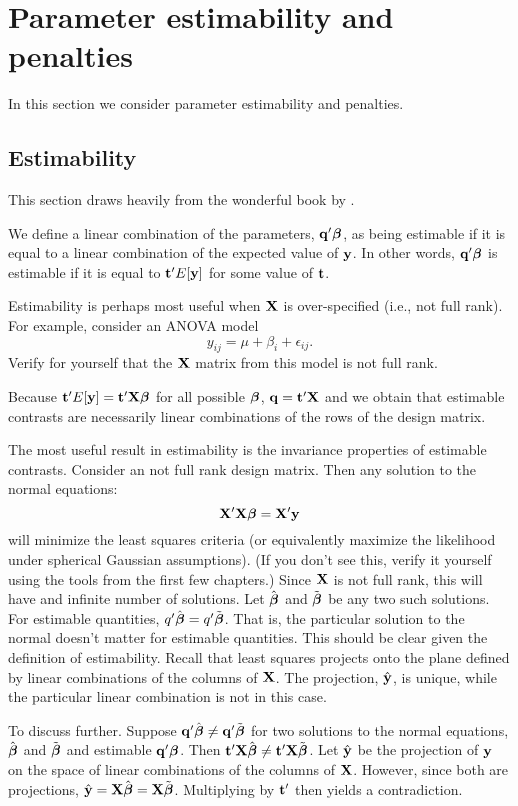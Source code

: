 \section{Parameter estimability and penalties}

In this section we consider parameter estimability and penalties. 

\subsection{Estimability}

This section draws heavily from the wonderful book by \cite{searle2012linear}.

We define a linear combination of the parameters, $\mathbf{q}' \boldsymbol{\beta}$, as being estimable
if it is equal to a linear combination of the expected value of $\mathbf{y}$. In other words,
$\mathbf{q}' \boldsymbol{\beta}$ is estimable if it is equal to $\mathbf{t}' E[\mathbf{y}]$ for some value of $\mathbf{t}$.

Estimability is perhaps most useful when $\mathbf{X}$ is over-specified (i.e., not full rank). For example,
consider an ANOVA model
$$
y_{ij} = \mu + \beta_i + \epsilon_{ij}.
$$
Verify for yourself that the $\mathbf{X}$ matrix from this model is not full rank. 

Because $\mathbf{t}' E[\mathbf{y}] = \mathbf{t}' \mathbf{X} \boldsymbol{\beta}$ for all possible $\boldsymbol{\beta}$, $\mathbf{q} = \mathbf{t}' \mathbf{X}$ and
we obtain that estimable contrasts are necessarily linear combinations of the rows
of the design matrix. 

The most useful result in estimability is the invariance properties of estimable contrasts. Consider an not full rank design matrix.
Then any solution to the normal equations:
$$
\mathbf{X}' \mathbf{X} \boldsymbol{\beta} = \mathbf{X}' \mathbf{y}
$$
will minimize the least squares criteria (or equivalently maximize the likelihood
under spherical Gaussian assumptions). (If you don't see this, verify it yourself using
the tools from the first few chapters.) Since $\mathbf{X}$ is not full rank, this will
have and infinite number of solutions. Let $\hat {\boldsymbol{\beta}}$ and $\tilde {\boldsymbol{\beta}}$ be any two such
solutions. For estimable quantities, $q' \hat {\boldsymbol{\beta}} = q' \tilde {\boldsymbol{\beta}}$. 
That is, the particular solution to the normal doesn't matter for estimable quantities. This should be
clear given the definition of estimability. Recall that least squares projects
onto the plane defined by linear combinations of the columns of $\mathbf{X}$. The projection,
$\hat {\mathbf{y}}$, is unique, while the particular linear combination is not in this case.

To discuss further. Suppose $\mathbf{q}' \hat {\boldsymbol{\beta}} \neq \mathbf{q}' \tilde {\boldsymbol{\beta}}$
for two solutions to the normal equations, $\hat {\boldsymbol{\beta}}$ and $\tilde {\boldsymbol{\beta}}$
and estimable $\mathbf{q}' \boldsymbol{\beta}$. Then $\mathbf{t}' \mathbf{X} \hat {\boldsymbol{\beta}} \neq \mathbf{t}' \mathbf{X} \tilde {\boldsymbol{\beta}}$. Let
$\hat {\mathbf{y}}$ be the projection of $\mathbf{y}$ on the space of linear combinations of the columns of $\mathbf{X}$.
However, since both are projections, $\hat {\mathbf{y}} = \mathbf{X} \hat {\boldsymbol{\beta}} = \mathbf{X} \tilde {\boldsymbol{\beta}}$. 
Multiplying by $\mathbf{t}'$ then yields a contradiction.

